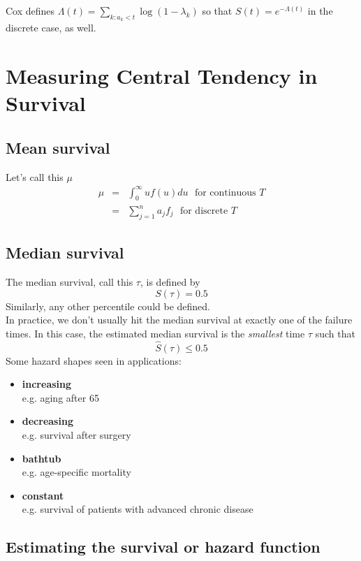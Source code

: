 \documentclass[11pt,slidesonly,semrot,portrait,palatino]{book}
\begin{document}
Cox defines $\Lambda(t)=\sum_{k:a_k<t}\log(1-\lambda_k)$ so that
$S(t)=e^{-\Lambda(t)}$ in the discrete case, as well.
\section{Measuring Central Tendency in Survival}
\subsection{Mean survival}
Let's call this $\mu$ \
\begin{eqnarray*}
 \mu & = & \int_{0}^{\infty} u f(u)du ~~~\mbox{for continuous } T\\
 & = & \sum_{j=1}^n a_j f_j ~~~\mbox{for discrete } T
 \end{eqnarray*}
\subsection{Median survival}
The median survival, call this $\tau$, is defined by
\[  S(\tau) = 0.5 \]
Similarly, any other percentile could be defined.
\\[2ex]
In practice, we don't usually hit the median survival at exactly
one of the failure times.  In this case, the estimated median survival
is the {\em smallest} time $\tau$ such that $$\hat{S}(\tau)\leq 0.5$$
Some hazard shapes seen in applications:
\begin{itemize}
\item {\bf increasing}\\[1ex]
e.g. aging after 65
\item{\bf decreasing} \\[1ex]
e.g. survival after surgery
\item {\bf bathtub} \\[1ex]
e.g. age-specific mortality
\item {\bf constant} \\[1ex]
e.g. survival of patients with advanced chronic disease
\end{itemize}
\begin{center}
\section{Estimating the survival or hazard function}
\end{center}
\end{document}
